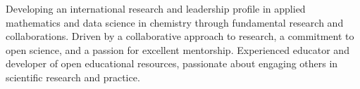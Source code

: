 \vspace{0.25cm}

\begin{cvparagraph}

Developing an international research and leadership profile in applied mathematics and data science in chemistry through fundamental research and collaborations.
Driven by a collaborative approach to research, a commitment to open science, and a passion for excellent mentorship.
Experienced educator and developer of open educational resources, passionate about engaging others in scientific research and practice.
\end{cvparagraph}
